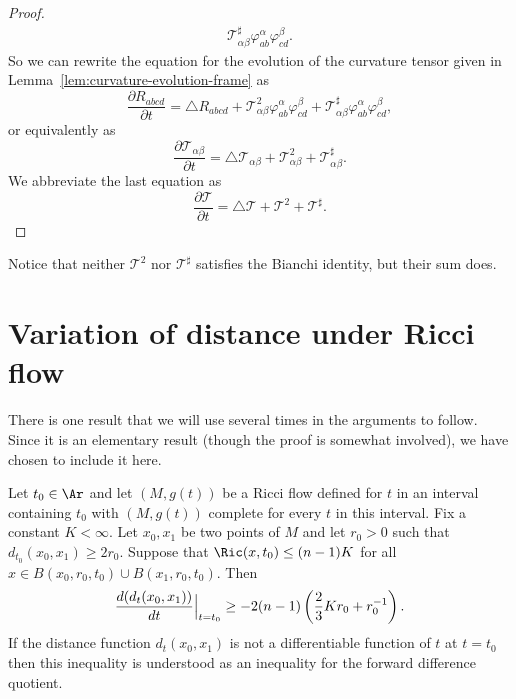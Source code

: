 \begin{proof}
\begin{align*}
{\mathcal
T}^{\sharp}_{\alpha\beta}\varphi^{\alpha}_{ab}\varphi^{\beta}_{cd}.
\end{align*}
So we can rewrite the equation for the evolution of the curvature
tensor given in Lemma~\ref{lem:curvature-evolution-frame} as \[ \frac{\partial R_{abcd}
}{\partial t} = \triangle R_{abcd} + {\mathcal
T}^{2}_{\alpha\beta}\varphi^{\alpha}_{ab}\varphi^{\beta}_{cd} +
{\mathcal
T}^{\sharp}_{\alpha\beta}\varphi^{\alpha}_{ab}\varphi^{\beta}_{cd},
\] or equivalently as \[ \frac{\partial {\mathcal T}_{\alpha\beta}}{\partial t}
= \triangle {\mathcal T}_{\alpha\beta} + {\mathcal
T}^{2}_{\alpha\beta} + {\mathcal T}^{\sharp}_{\alpha\beta}. \] We
abbreviate the last equation as
\[ \frac{\partial {\mathcal T}}{\partial t}= \triangle {\mathcal T} + {\mathcal T}^{2} +
{\mathcal T}^{\sharp}.\]
\end{proof}

\begin{remark}\label{rem:bianchi-identity-operator-squares}
Notice that neither ${\mathcal T}^{2}$ nor ${\mathcal T}^{\sharp}$
satisfies the Bianchi identity, but their sum does.
\end{remark}


\section{Variation of distance under Ricci flow}

There is one result that we will use several times in the arguments
to follow. Since it is an elementary result (though the proof is
somewhat involved), we have chosen to include it here.

\begin{proposition}\label{prop:distance-variation-lower-bound}
\label{I.8.3}

 Let $t_0\in \Ar$ and let $(M,g(t))$ be a Ricci flow defined for $t$ in an interval containing $t_0$
 with $(M,g(t))$ complete for every $t$ in this interval. Fix a constant $K<\infty$.  Let $x_0,x_1$ be two points
of $M$ and let $r_0>0$ such that $d_{t_0}(x_0,x_1)\ge 2r_0$. Suppose
that $\Ric(x,t_0)\le (n-1)K$ for all $x\in B(x_0,r_0,t_0)\cup
B(x_1,r_0,t_0)$. Then
$$\frac{d(d_t(x_0,x_1))}{dt}\Bigl|_{t=t_0}\Bigr.\ge -2(n-1)\left(\frac{2}{3}Kr_0+r_0^{-1}\right).$$
 If the distance function $d_{t}(x_0,x_1)$ is not a differentiable
function of $t$ at $t=t_0$ then this inequality is understood as an
inequality for the forward difference quotient.
\end{proposition}



